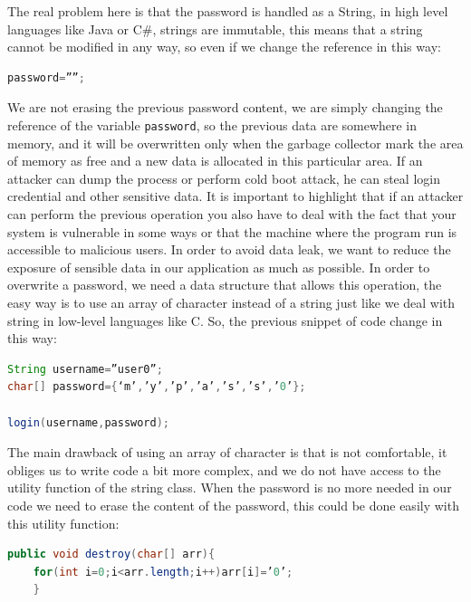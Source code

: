 The real problem here is that the password is handled as a String, in high level languages like Java or C\#, strings are immutable, this means that a string cannot be modified in any way, so even if we change the reference in this way:
\begin{lstlisting}[language=java]
password=””;
\end{lstlisting}

We are not erasing the previous password content, we are simply changing the reference of the variable \texttt{password}, so the previous data are somewhere in memory, and it will be overwritten only when the garbage collector mark the area of memory as free and a new data is allocated in this particular area.\newline
If an attacker can dump the process or perform cold boot attack, he can steal login credential and other sensitive data.
It is important to highlight that if an attacker can perform the previous operation you also have to deal with the fact that your system is vulnerable in some ways or that the machine where the program run is accessible to malicious users.\newline
In order to avoid data leak, we want to reduce the exposure of sensible data in our application as much as possible.\newline
In order to overwrite a password, we need a data structure that allows this operation, the easy way is to use an array of character instead of a string just like we deal with string in low-level languages like C.\newline
So, the previous snippet of code change in this way:
\begin{lstlisting}[language=Java]
String username=”user0”;
char[] password={‘m’,’y’,’p’,’a’,’s’,’s’,’0’};

login(username,password);
\end{lstlisting}


The main drawback of using an array of character is that is not comfortable, it obliges us to write code a bit more complex, and we do not have access to the utility function of the string class.
When the password is no more needed in our code we need to erase the content of the password, this could be done easily with this utility function:
\begin{lstlisting}[language=Java]
	public void destroy(char[] arr){
	for(int i=0;i<arr.length;i++)arr[i]=’0’;
	}
\end{lstlisting}

